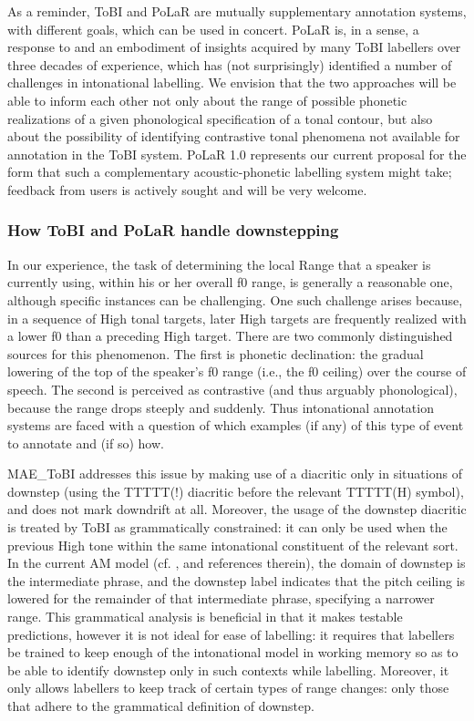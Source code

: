 \documentclass[11pt, twoside]{memoir}
\begin{document}
As a reminder, ToBI and PoLaR are mutually supplementary annotation systems, with different goals, which can be used in concert.  PoLaR is, in a sense, a response to and an embodiment of insights acquired by many ToBI labellers over three decades of experience, which has (not surprisingly) identified a number of challenges in intonational labelling. We envision that the two approaches will be able to inform each other not only about the range of possible phonetic realizations of a given phonological specification of a tonal contour, but also about the possibility of identifying contrastive tonal phenomena not available for annotation in the ToBI system. PoLaR 1.0 represents our current proposal for the form that such a complementary acoustic-phonetic labelling system might take; feedback from users is actively sought and will be very welcome.

\subsubsection{How ToBI and PoLaR handle downstepping}\label{sec:downstepping-am-models-and-tobi-annotation}
In our experience, the task of determining the local Range that a speaker is currently using, within his or her overall f0 range, is generally a reasonable one, although specific instances can be challenging. One such challenge arises because, in a sequence of High tonal targets, later High targets are frequently realized with a lower f0 than a preceding High target. There are two commonly distinguished sources for this phenomenon. The first is phonetic declination: the gradual lowering of the top of the speaker’s f0 range (i.e., the f0 ceiling) over the course of speech. The second is perceived as contrastive (and thus arguably phonological), because the range drops steeply and suddenly. Thus intonational annotation systems are faced with a question of which examples (if any) of this type of event to annotate and (if so) how.

MAE\_ToBI addresses this issue by making use of a diacritic only in situations of downstep (using the TTTTT(!) diacritic before the relevant TTTTT(H) symbol), and does not mark downdrift at all. Moreover, the usage of the downstep diacritic is treated by ToBI as grammatically constrained: it can only be used when the previous High tone within the same intonational constituent of the relevant sort. In the current AM model (cf. \citealt[17–18]{beckman-05}, and references therein), the domain of downstep is the intermediate phrase, and the downstep label indicates that the pitch ceiling is lowered for the remainder of that intermediate phrase, specifying a narrower range. This grammatical analysis is beneficial in that it makes testable predictions, however it is not ideal for ease of labelling: it requires that labellers be trained to keep enough of the intonational model in working memory so as to be able to identify downstep only in such contexts while labelling. Moreover, it only allows labellers to keep track of certain types of range changes: only those that adhere to the grammatical definition of downstep.
\end{document}
